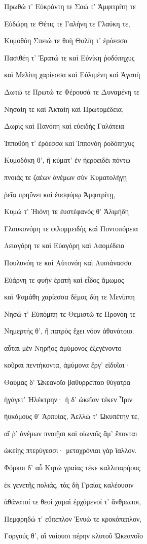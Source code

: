 \begin{pages}
\begin{Leftside}
Πρωθώ τ' Εὐκράντη τε Σαώ τ' Ἀμφιτρίτη τε 

Εὐδώρη τε Θέτις τε Γαλήνη τε Γλαύκη τε,

Κυμοθόη Σπειώ τε θοὴ Θαλίη τ' ἐρόεσσα 

Πασιθέη τ' Ἐρατώ τε καὶ Εὐνίκη ῥοδόπηχυς

καὶ Μελίτη χαρίεσσα καὶ Εὐλιμένη καὶ Ἀγαυὴ

Δωτώ τε Πρωτώ τε Φέρουσά τε Δυναμένη τε

Νησαίη τε καὶ Ἀκταίη καὶ Πρωτομέδεια,

Δωρὶς καὶ Πανόπη καὶ εὐειδὴς Γαλάτεια  

Ἱπποθόη τ' ἐρόεσσα καὶ Ἱππονόη ῥοδόπηχυς

Κυμοδόκη θ', ἣ κύματ' ἐν ἠεροειδέι πόντῳ

πνοιάς τε ζαέων ἀνέμων σὺν Κυματολήγῃ

ῥεῖα πρηΰνει καὶ ἐυσφύρῳ Ἀμφιτρίτῃ,

Κυμώ τ' Ἠιόνη τε ἐυστέφανός θ' Ἁλιμήδη 

Γλαυκονόμη τε φιλομμειδὴς καὶ Ποντοπόρεια

Λειαγόρη τε καὶ Εὐαγόρη καὶ Λαομέδεια 

Πουλυνόη τε καὶ Αὐτονόη καὶ Λυσιάνασσα

Εὐάρνη τε φυὴν ἐρατὴ καὶ εἶδος ἄμωμος

καὶ Ψαμάθη χαρίεσσα δέμας δίη τε Μενίππη 

Νησώ τ' Εὐπόμπη τε Θεμιστώ τε Προνόη τε

Νημερτής θ', ἣ πατρὸς ἔχει νόον ἀθανάτοιο.

αὗται μὲν Νηρῆος ἀμύμονος ἐξεγένοντο

κοῦραι πεντήκοντα, ἀμύμονα ἔργ' εἰδυῖαι· 

Θαύμας δ' Ὠκεανοῖο βαθυρρείταο θύγατρα 

ἠγάγετ' Ἠλέκτρην· ἡ δ' ὠκεῖαν τέκεν Ἶριν 

ἠυκόμους θ' Ἁρπυίας, Ἀελλώ τ' Ὠκυπέτην τε, 

αἵ ῥ' ἀνέμων πνοιῇσι καὶ οἰωνοῖς ἅμ' ἕπονται

ὠκείῃς πτερύγεσσι· μεταχρόνιαι γὰρ ἴαλλον. 

Φόρκυι δ' αὖ Κητὼ γραίας τέκε καλλιπαρήους 

ἐκ γενετῆς πολιάς, τὰς δὴ Γραίας καλέουσιν

ἀθάνατοί τε θεοὶ χαμαὶ ἐρχόμενοί τ' ἄνθρωποι,

Πεμφρηδώ τ' εὔπεπλον Ἐνυώ τε κροκόπεπλον,

Γοργούς θ', αἳ ναίουσι πέρην κλυτοῦ Ὠκεανοῖο


\end{Leftside}
\end{pages}
